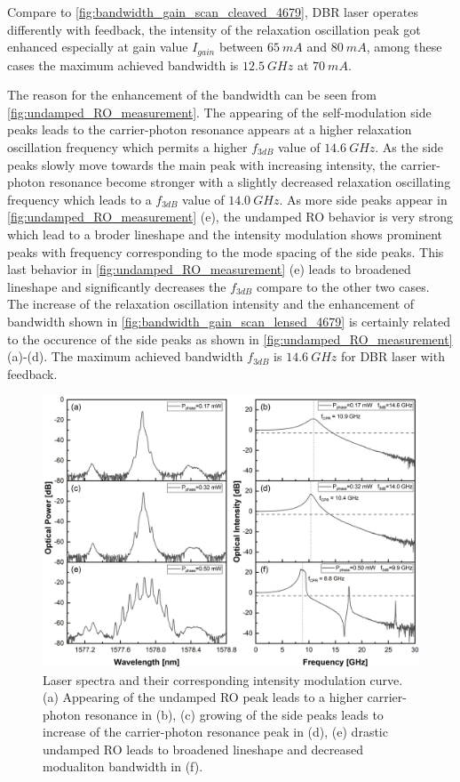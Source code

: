 Compare to \autoref{fig:bandwidth_gain_scan_cleaved_4679}, DBR laser operates differently with feedback, the intensity of the relaxation oscillation peak got enhanced especially at gain value $I_{gain}$ between $65 \ mA$ and $80 \ mA$, among these cases the maximum achieved bandwidth is $12.5 \ GHz$ at $70 \ mA$. 

The reason for the enhancement of the bandwidth can be seen from \autoref{fig:undamped_RO_measurement}. The appearing of the self-modulation side peaks leads to the carrier-photon resonance appears at a higher relaxation oscillation frequency which permits a higher $f_{3dB}$ value of $14.6 \ GHz$. As the side peaks slowly move towards the main peak with increasing intensity, the carrier-photon resonance become stronger with a slightly decreased relaxation oscillating frequency which leads to a $f_{3dB}$ value of $14.0 \ GHz$. As more side peaks appear in \autoref{fig:undamped_RO_measurement} (e), the undamped RO behavior is very strong which lead to a broder lineshape and the intensity modulation shows prominent peaks with frequency corresponding to the mode spacing of the side peaks. This last behavior in \autoref{fig:undamped_RO_measurement} (e) leads to broadened lineshape and significantly decreases the $f_{3dB}$ compare to the other two cases. The increase of the relaxation oscillation intensity and the enhancement of bandwidth shown in \autoref{fig:bandwidth_gain_scan_lensed_4679} is certainly related to the occurence of the side peaks as shown in \autoref{fig:undamped_RO_measurement} (a)-(d). The maximum achieved bandwidth $f_{3dB}$ is $14.6 \ GHz$ for DBR laser with feedback.

\begin{figure}[ht]
    \centering
    \includegraphics[width=\linewidth]{figures/Undamped_RO_and_bandwidth_grating_4621.png}
    \caption{Laser spectra and their corresponding intensity modulation curve. (a) Appearing of the undamped RO peak leads to a higher carrier-photon resonance in (b), (c) growing of the side peaks leads to increase of the carrier-photon resonance peak in (d), (e) drastic undamped RO leads to broadened lineshape and decreased modualiton bandwidth in (f).}
    \label{fig:undamped_RO_measurement}
\end{figure}

